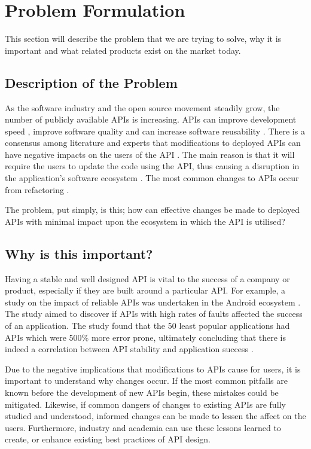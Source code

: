 \documentclass{article}
\begin{document}
\section{Problem Formulation}
This section will describe the problem that we are trying to solve, why it is important and what related products exist on the market today.

\subsection{Description of the Problem}

As the software industry and the open source movement steadily grow, the number of publicly available APIs is increasing. APIs can improve development speed \cite{stylos2006comparing}, improve software quality \cite{stylos2006comparing} and can increase software reusability \cite{afonso2012evaluating}. There is a consensus among literature and experts that modifications to deployed APIs can have negative impacts on the users of the API \cite{google_talk} \cite{mcdonnell2013empirical} \cite{robbes2012developers} \cite{henning2007api}. The main reason is that it will require the users to update the code using the API, thus causing a disruption in the application's software ecosystem \cite{messerschmitt2005software}. The most common changes to APIs occur from refactoring \cite{dig2005role} \cite{xing2006refactoring}.

The problem, put simply, is this; how can effective changes be made to deployed APIs with minimal impact upon the ecosystem in which the API is utilised?

\subsection{Why is this important?}
Having a stable and well designed API is vital to the success of a company or product, especially if they are built around a particular API. For example, a study on the impact of reliable APIs was undertaken in the Android ecosystem \cite{mcdonnell2013empirical}. The study aimed to discover if APIs with high rates of faults affected the success of an application. The study found that the 50 least popular applications had APIs which were 500\% more error prone, ultimately concluding that there is indeed a correlation between API stability and application success \cite{mcdonnell2013empirical}. 

Due to the negative implications that modifications to APIs cause for users, it is important to understand why changes occur. If the most common pitfalls are known before the development of new APIs begin, these mistakes could be mitigated. Likewise, if common dangers of changes to existing APIs are fully studied and understood, informed changes can be made to lessen the affect on the users. Furthermore, industry and academia can use these lessons learned to create, or enhance existing best practices of API design.
\end{document}
